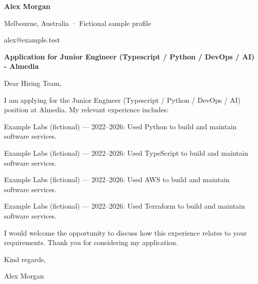 \documentclass[10pt,a4paper]{article}
\begin{document}
{\LARGE\bfseries\color{navy} Alex Morgan}\par
Melbourne, Australia · Fictional sample profile\par
alex@example.test\par
{\large\bfseries\color{navy} Application for Junior Engineer (Typescript / Python / DevOps / AI) - Almedia}\par
Dear Hiring Team,\par
I am applying for the Junior Engineer (Typescript / Python / DevOps / AI) position at Almedia. My relevant experience includes:\par
Example Labs (fictional) — 2022–2026: Used Python to build and maintain software services.\par
Example Labs (fictional) — 2022–2026: Used TypeScript to build and maintain software services.\par
Example Labs (fictional) — 2022–2026: Used AWS to build and maintain software services.\par
Example Labs (fictional) — 2022–2026: Used Terraform to build and maintain software services.\par
I would welcome the opportunity to discuss how this experience relates to your requirements. Thank you for considering my application.\par
Kind regards,\par
Alex Morgan\par
\end{document}
